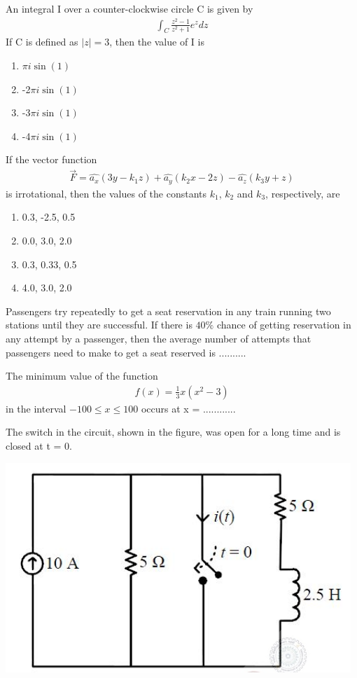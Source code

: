 \item An integral I over a counter-clockwise circle C is given by
\begin{align*}
\int_{C}^{}\frac{z^2 - 1}{z^2 + 1}e^z dz
\end{align*} 
If C is defined as $|z| = 3$, then the value of I is 
\begin{enumerate}
\item $\pi i \sin(1)$
\item -2$\pi i \sin(1)$
\item -3$\pi i \sin(1)$
\item -4$\pi i \sin(1)$
\end{enumerate}

\item If the vector function 
\begin{align*}
\overrightarrow{F} = \hat{a_x}(3y - k_1z) + \hat{a_y}(k_2x - 2z) - \hat{a_z}(k_3y + z)
\end{align*}
is irrotational, then the values of the constants $k_1$, $k_2$ and $k_3$, respectively, are
\begin{enumerate}
\item 0.3, -2.5, 0.5
\item 0.0, 3.0, 2.0
\item 0.3, 0.33, 0.5
\item 4.0, 3.0, 2.0
\end{enumerate}

\item Passengers try repeatedly to get a seat reservation in any train running two stations until they are successful. If there is $40\%$ chance of getting reservation in any attempt by a passenger, then the average number of attempts that passengers need to make to get a seat reserved is ..........

\item The minimum value of the function 
\begin{align*}
f(x) = \frac{1}{3}x(x^2 -3)
\end{align*}
in the interval $-100 \leq x \leq 100$ occurs at x = ............

\item The switch in the circuit, shown in the figure, was open for a long time and is closed at t = 0.

\includegraphics[scale=0.3]{31}

